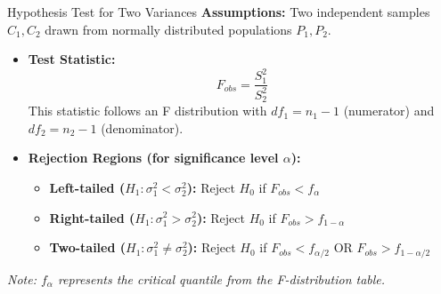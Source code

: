 \begin{defbox}{Hypothesis Test for Two Variances}
\textbf{Assumptions:} Two independent samples $C_1, C_2$ drawn from normally distributed populations $P_1, P_2$.

\begin{itemize}
    \item \textbf{Test Statistic:}
    \begin{equation}
        F_{obs} = \frac{S_1^2}{S_2^2}
    \end{equation}
    This statistic follows an F distribution with $df_1 = n_1 - 1$ (numerator) and $df_2 = n_2 - 1$ (denominator).
\end{itemize}

\vs
\begin{itemize}
    \item \textbf{Rejection Regions (for significance level $\alpha$):}
    \begin{itemize}
        \item \textbf{Left-tailed ($H_1: \sigma_1^2 < \sigma_2^2$):} Reject $H_0$ if $F_{obs} < f_{\alpha}$
        \item \textbf{Right-tailed ($H_1: \sigma_1^2 > \sigma_2^2$):} Reject $H_0$ if $F_{obs} > f_{1-\alpha}$
        \item \textbf{Two-tailed ($H_1: \sigma_1^2 \neq \sigma_2^2$):} Reject $H_0$ if $F_{obs} < f_{\alpha/2}$ OR $F_{obs} > f_{1-\alpha/2}$
    \end{itemize}
\end{itemize}
\textit{Note: $f_{\alpha}$ represents the critical quantile from the F-distribution table.}
\end{defbox}

